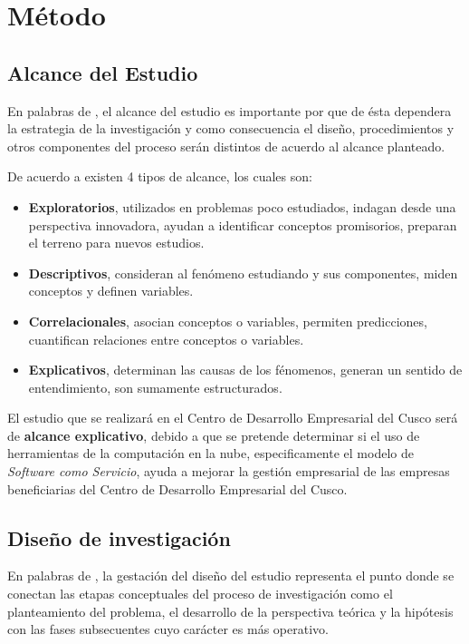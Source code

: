
\chapter{M\'etodo}
\section{Alcance del Estudio}
En palabras de \cite{sampieri}, el alcance del estudio es importante por que de
\'esta dependera la estrategia de la investigaci\'on y como consecuencia el dise\~no,
procedimientos y otros componentes del proceso ser\'an distintos de acuerdo al alcance
planteado.

De acuerdo a \cite{sampieri} existen 4 tipos de alcance, los cuales son:
\begin{itemize}
    \item \textbf{Exploratorios}, utilizados en problemas poco estudiados, indagan
          desde una perspectiva innovadora, ayudan a identificar conceptos promisorios,
          preparan el terreno para nuevos estudios.
    \item \textbf{Descriptivos}, consideran al fen\'omeno estudiando y sus componentes,
          miden conceptos y definen variables.
    \item \textbf{Correlacionales}, asocian conceptos o variables, permiten predicciones,
          cuantifican relaciones entre conceptos o variables.
    \item \textbf{Explicativos}, determinan las causas de los f\'enomenos, generan un
          sentido de entendimiento, son sumamente estructurados.
\end{itemize}

El estudio que se realizar\'a en el Centro de Desarrollo Empresarial del Cusco ser\'a
de \textbf{alcance explicativo}, debido a que se pretende determinar si el uso
de herramientas de la computaci\'on en la nube, especificamente el modelo de
\emph{Software como Servicio}, ayuda a mejorar la gesti\'on empresarial de las empresas
beneficiarias del Centro de Desarrollo Empresarial del Cusco.

\section{Dise\~no de investigaci\'on}
En palabras de \cite{sampieri}, la gestaci\'on del dise\~no del estudio representa
el punto donde se conectan las etapas conceptuales del proceso de investigaci\'on
como el planteamiento del problema, el desarrollo de la perspectiva te\'orica y
la hip\'otesis con las fases subsecuentes cuyo car\'acter es m\'as operativo.

